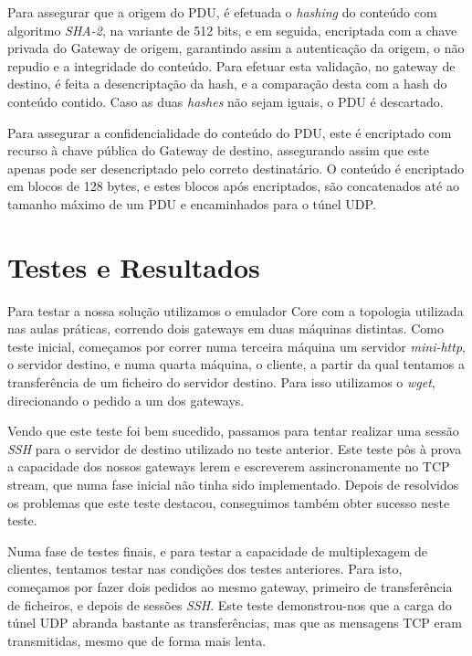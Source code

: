 \documentclass[a4paper]{report}
\begin{document}
Para assegurar que a origem do PDU, é efetuada o \textit{hashing} do conteúdo
com algoritmo \textit{SHA-2}, na variante de 512 bits, e em seguida, encriptada
com a chave privada do Gateway de origem, garantindo assim a autenticação da
origem, o não repudio e a integridade do conteúdo. Para efetuar esta validação,
no gateway de destino, é feita a desencriptação da hash, e a comparação desta 
com a hash do conteúdo contido. Caso as duas \textit{hashes} não sejam iguais, o
PDU é descartado.

Para assegurar a confidencialidade do conteúdo do PDU, este é encriptado com
recurso à chave pública do Gateway de destino, assegurando assim que este
apenas pode ser desencriptado pelo correto destinatário. O conteúdo é 
encriptado em blocos de 128 bytes, e estes blocos após encriptados, são
concatenados até ao tamanho máximo de um PDU e encaminhados para o túnel
UDP.

\chapter{Testes e Resultados}

Para testar a nossa solução utilizamos o emulador Core com a topologia utilizada
nas aulas práticas, correndo dois gateways em duas máquinas distintas. Como
teste inicial, começamos por correr numa terceira máquina um servidor 
\textit{mini-http}, o servidor destino, e numa quarta máquina, o cliente,
a partir da qual tentamos a transferência de um ficheiro do servidor destino.
Para isso utilizamos o \textit{wget}, direcionando o pedido a um dos gateways.

Vendo que este teste foi bem sucedido, passamos para tentar realizar uma
sessão \textit{SSH} para o servidor de destino utilizado no teste anterior.
Este teste pôs à prova a capacidade dos nossos gateways lerem e escreverem
assincronamente no TCP stream, que numa fase inicial não tinha sido
implementado. Depois de resolvidos os problemas que este teste destacou,
conseguimos também obter sucesso neste teste.

Numa fase de testes finais, e para testar a capacidade de multiplexagem de
clientes, tentamos testar nas condições dos testes anteriores. Para isto,
começamos por fazer dois pedidos ao mesmo gateway, primeiro de transferência de
ficheiros, e depois de sessões \textit{SSH}. Este teste demonstrou-nos que
a carga do túnel UDP abranda bastante as transferências, mas que as mensagens
TCP eram transmitidas, mesmo que de forma mais lenta. 
\end{document}
